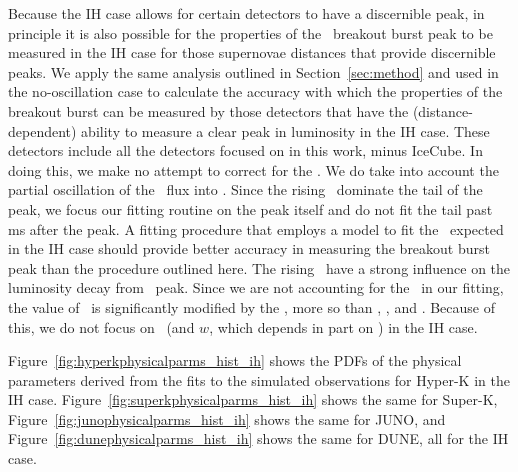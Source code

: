 Because the IH case allows for certain detectors to have a 
discernible peak, in principle it is also possible for the properties
of the \nue\ breakout burst peak to be measured in the IH case for
those 
supernovae
distances that provide discernible peaks.  We apply the same
analysis outlined in Section~\ref{sec:method} and used in the
no-oscillation case to calculate the accuracy with which the
properties of the breakout burst can be measured by those 
detectors that have the (distance-dependent) ability to measure a
clear peak in luminosity in the IH case.  
These detectors include all the detectors
focused on in this work, minus IceCube.  In doing this, we make no
attempt to correct for the \backgrounds.  We do
take into account the partial oscillation of the \nue\ flux into \nuxpart.
Since the rising \background\ dominate the tail of the peak, we focus
our fitting routine on the peak itself and do not fit the tail past 
ms after the peak.  A fitting procedure that employs a model to fit
the \backgrounds\ expected in the IH case should provide better accuracy
in measuring the breakout burst peak than the procedure outlined
here.  The rising \background\ have a strong influence on the
luminosity decay from \nue\ peak.  Since we are not accounting for the
\backgrounds\ in our fitting, the value of \tfall\ is significantly
modified by the \backgrounds, more so than \lmax, \tmax,
and \trise.  Because of this, we do not focus on \tfall\ (and $w$,
which depends in part on \tfall) in the IH case.


Figure~\ref{fig:hyperkphysicalparms_hist_ih} shows the PDFs of the
physical parameters derived from the fits to the simulated
observations for Hyper-K in the IH
case. Figure~\ref{fig:superkphysicalparms_hist_ih} shows the same for
Super-K, Figure~\ref{fig:junophysicalparms_hist_ih} shows the same
for JUNO, and Figure~\ref{fig:dunephysicalparms_hist_ih} shows the
same for DUNE, all for the IH case.


